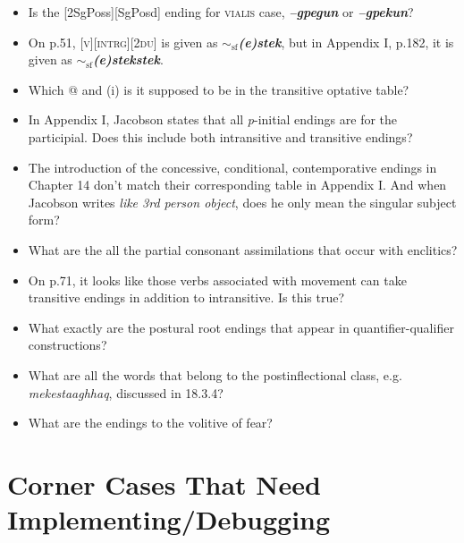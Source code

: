 \documentclass{article}
\begin{document}
\begin{itemize}
\renewcommand\labelitemi{$\cdot$}

\item Is the [2SgPoss][SgPosd] ending for \textsc{vialis} case, \textit{\textbf{--gpegun}} or \textit{\textbf{--gpekun}}?

\item On p.51, \textsc{[v][intrg][2du]} is given as \textit{\textbf{$\sim_\text{sf}$(e)stek}}, but in Appendix I, p.182, it is given as \textit{\textbf{$\sim_\text{sf}$(e)stekstek}}.

\item Which @ and (i) is it supposed to be in the transitive optative table?

\item In Appendix I, Jacobson states that all \textit{p}-initial endings are for the participial.
%
Does this include both intransitive and transitive endings?

\item The introduction of the concessive, conditional, contemporative endings in Chapter 14 don't match their corresponding table in Appendix I.
%
And when Jacobson writes \textit{like 3rd person object}, does he only mean the singular subject form?

\item What are the all the partial consonant assimilations that occur with enclitics?

\item On p.71, it looks like those verbs associated with movement can take transitive endings in addition to intransitive.
%
Is this true?

\item What exactly are the postural root endings that appear in quantifier-qualifier constructions?

\item What are all the words that belong to the postinflectional class, e.g. \textit{mekestaaghhaq}, discussed in 18.3.4?

\item What are the endings to the volitive of fear?

\end{itemize}


\section{Corner Cases That Need Implementing/Debugging}
\end{document}

